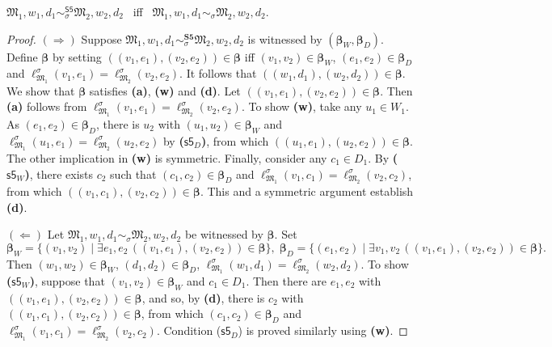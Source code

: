 \documentclass{lmcs} %
\theoremstyle{plain}\newtheorem{satz}[thm]{Satz} %
\newcommand{\bs}{\boldsymbol{\beta}}
\begin{document}
\begin{thm}\label{S5bisim}
$\mathfrak{M}_1,w_1,d_1  \sim_{\sigma}^{\mathsf{S5}} \mathfrak{M}_2,w_2,d_2$ \ iff \ 
$\mathfrak{M}_1,w_1,d_1  \sim_\sigma \mathfrak{M}_2,w_2,d_2$.
\end{thm}
%
\begin{proof}
	$(\Rightarrow)$ Suppose $\mathfrak{M}_1,w_1,d_1  \sim_\sigma^{\textbf{S5}} \mathfrak{M}_2,w_2,d_2$ is witnessed by $(\bs_{W},\bs_{D})$. Define $\bs$ by setting $((v_1,e_1),(v_2,e_2))\in \bs$ iff $(v_1,v_2)\in \bs_{W}$, $(e_1,e_2)\in \bs_{D}$ and $\ell^\sigma_{\mathfrak M_1}(v_1,e_1)=\ell^\sigma_{\mathfrak M_2}(v_2,e_2)$. It follows that $((w_1,d_1),(w_2,d_2))\in \bs$. We show that $\bs$ satisfies {\bf (a)}, {\bf (w)} and {\bf (d)}. Let $((v_1,e_1),(v_2,e_2))\in \bs$. Then {\bf (a)} follows from $\ell^\sigma_{\mathfrak M_1}(v_1,e_1)=\ell^\sigma_{\mathfrak M_2}(v_2,e_2)$. To show {\bf (w)}, take any $u_1 \in W_1$. As $(e_1,e_2) \in \bs_D$, there is $u_2$ with $(u_1,u_2) \in \bs_W$ and $\ell^\sigma_{\mathfrak M_1}(u_1,e_1) =\ell^\sigma_{\mathfrak M_2}(u_2,e_2)$ by \textbf{($\mathsf{s5}_D$)}, 
from which $((u_1,e_1),(u_2,e_2))\in \bs$. The other implication in {\bf (w)} is symmetric. Finally, consider any $c_1 \in D_1$. By \textbf{($\mathsf{s5}_W$)}, there exists $c_2$ such that $(c_1,c_2)\in \bs_{D}$ and $\ell^\sigma_{\mathfrak M_1}(v_1,c_1) =\ell^\sigma_{\mathfrak M_2}(v_2,c_2)$, from which $((v_1,c_1),(v_2,c_2))\in \bs$. This and a symmetric argument establish  {\bf (d)}.
	
	$(\Leftarrow)$ Let $\mathfrak{M}_1,w_1,d_1  \sim_\sigma \mathfrak{M}_2,w_2,d_2$ be witnessed by $\bs$. Set 
$$
\bs_{W}\!=\! \{(v_1,v_2) \mid \exists e_1,e_2\, ((v_1,e_1),(v_2,e_2))\!\in\!\bs\},\;
\bs_{D}\!=\! \{(e_1,e_2) \mid \exists v_1,v_2\, ((v_1,e_1),(v_2,e_2)) \!\in\! \bs\}.
$$
	Then $(w_1,w_2)\in \bs_{W}$, $(d_1,d_2)\in \bs_{D}$, 
	$\ell^\sigma_{\mathfrak M_1}(w_1,d_1)=\ell^\sigma_{\mathfrak M_2}(w_2,d_2)$. To show \textbf{($\mathsf{s5}_W$)}, suppose that $(v_1,v_2)\in \bs_{W}$ and $c_1\in D_1$. Then there are $e_1,e_2$ with $((v_1,e_1),(v_2,e_2))\in \bs$, and so, by {\bf (d)}, there is $c_2$ with $((v_1,c_1),(v_2,c_2)) \in \bs$, from which $(c_1,c_2) \in \bs_D$ and $\ell^\sigma_{\mathfrak M_1}(v_1,c_1) =\ell^\sigma_{\mathfrak M_2}(v_2,c_2)$. Condition ($\mathsf{s5}_D$) is proved similarly using {\bf (w)}. 
\end{proof}
\end{document}
